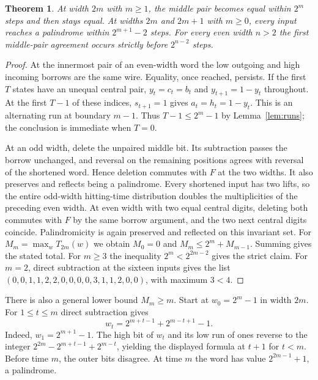 \documentclass[11pt]{article}
\newtheorem{theorem}{Theorem}
\begin{document}
\begin{theorem}\label{thm:quant}
At width $2m$ with $m\ge1$, the middle pair becomes equal within $2^m$ steps and then stays equal. At widths $2m$ and $2m+1$ with $m\ge0$, every input reaches a palindrome within $2^{m+1}-2$ steps. For every even width $n>2$ the first middle-pair agreement occurs strictly before $2^{n-2}$ steps.
\end{theorem}
\begin{proof}
At the innermost pair of an even-width word the low outgoing and high incoming borrows are the same wire. Equality, once reached, persists. If the first $T$ states have an unequal central pair, $y_t=c_t=b_t$ and $y_{t+1}=1-y_t$ throughout. At the first $T-1$ of these indices, $s_{t+1}=1$ gives $a_t=h_t=1-y_t$. This is an alternating run at boundary $m-1$. Thus $T-1\le2^m-1$ by Lemma~\ref{lem:runs}; the conclusion is immediate when $T=0$.

At an odd width, delete the unpaired middle bit. Its subtraction passes the borrow unchanged, and reversal on the remaining positions agrees with reversal of the shortened word. Hence deletion commutes with $F$ at the two widths. It also preserves and reflects being a palindrome. Every shortened input has two lifts, so the entire odd-width hitting-time distribution doubles the multiplicities of the preceding even width. At even width with two equal central digits, deleting both commutes with $F$ by the same borrow argument, and the two next central digits coincide. Palindromicity is again preserved and reflected on this invariant set. For $M_m=\max_w T_{2m}(w)$ we obtain $M_0=0$ and $M_m\le 2^m+M_{m-1}$. Summing gives the stated total. For $m\ge3$ the inequality $2^m<2^{2m-2}$ gives the strict claim. For $m=2$, direct subtraction at the sixteen inputs gives the list $(0,0,1,1,2,2,0,0,0,0,3,1,1,2,0,0)$, with maximum $3<4$.\end{proof}

There is also a general lower bound $M_m\ge m$. Start at $w_0=2^m-1$ in width $2m$. For $1\le t\le m$ direct subtraction gives
\[
 w_t=2^{m+t-1}+2^{m-t+1}-1.
\]
Indeed, $w_1=2^{m+1}-1$. The high bit of $w_t$ and its low run of ones reverse to the integer $2^{2m}-2^{m+t-1}+2^{m-t}$, yielding the displayed formula at $t+1$ for $t<m$. Before time $m$, the outer bits disagree. At time $m$ the word has value $2^{2m-1}+1$, a palindrome.
\end{document}
